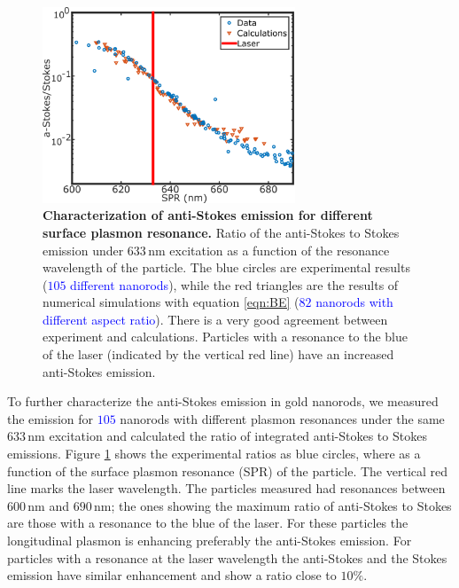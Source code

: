 \documentclass[journal=nalefd,manuscript=letter]{achemso}
\newcommand{\HI}[1]{\textcolor{blue}{#1}} %
\newcommand{\nm}{\ensuremath{\,\textrm{nm}}}
\begin{document}
\begin{figure}[tp] \centering
\includegraphics[width=75.5mm]{Figures/02_AS_vs_S_SPR/02_AS_vs_S_SPR.png}
\caption{\textbf{Characterization of anti-Stokes emission for different surface plasmon resonance.} 
Ratio of the anti-Stokes to Stokes emission under $633\nm$ excitation
as a function of the resonance wavelength of the particle.
The blue circles are experimental results (\HI{$105$ different nanorods}), while the red triangles are the
results of numerical simulations with equation \ref{eqn:BE} (\HI{$82$ nanorods with different aspect ratio}). 
There is a very good agreement between experiment and calculations. Particles with a resonance
to the blue of the laser (indicated by the vertical red line) have an increased anti-Stokes
emission.}
	\label{fig:ASS-ratio}
\end{figure}

To further characterize the anti-Stokes emission in gold nanorods, we measured the emission for \HI{$105$}
nanorods with different plasmon resonances under the same $633\nm$ excitation
and calculated the ratio of integrated anti-Stokes to Stokes emissions.
Figure \ref{fig:ASS-ratio} shows the experimental ratios as blue circles, where
as a function of the surface plasmon resonance (SPR) of the
particle. The vertical red line marks the laser wavelength. The particles measured 
had resonances between $600\nm$ and $690\nm$; the ones showing the
maximum ratio of anti-Stokes to Stokes are those with a resonance to the blue of
the laser. For these particles the longitudinal plasmon is enhancing preferably the
anti-Stokes emission. For particles with a resonance at the laser wavelength the
anti-Stokes and the Stokes emission have similar enhancement and show a ratio
close to $10\%$.
\end{document}
